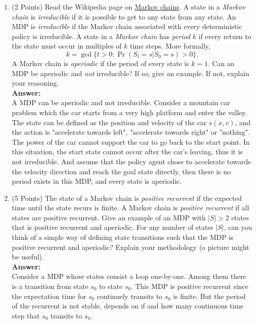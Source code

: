 \documentclass[]{article}
\begin{document}
\begin{enumerate}
    \item (2 Points) Read the Wikipedia page on \href{https://en.wikipedia.org/wiki/Markov_chain}{Markov chains}. A state in a \emph{Markov chain} is \emph{irreducible} if it is possible to get to any state from any state. An MDP is \emph{irreducible} if the Markov chain associated with every deterministic policy is irreducible. A state in a \emph{Markov chain} has \emph{period} $k$ if every return to the state must occur in multiples of $k$ time steps. More formally,
    $$
    k=\operatorname{gcd}\{t>0: \Pr (S_t=s|S_0=s)>0\}.
    $$
    A Markov chain is \emph{aperiodic} if the period of every state is $k=1$. Can an MDP be aperiodic and \emph{not} irreducible? If so, give an example. If not, explain your reasoning. \\
    \textbf{Answer:}\\
    A MDP can be aperiodic and not irreducible. Consider a mountain car problem which the car starts from a very high platform and enter the valley. The state can be defined as the position and velocity of the car $s(x,v)$, and the action is "accelerate towards left", "accelerate towards right" or "nothing". The power of the car cannot support the car to go back to the start point. In this situation, the start state cannot occur after the car's leaving, thus it is not irreducible. And assume that the policy agent chose to accelerate towards the velocity direction and reach the goal state directly, then there is no period exists in this MDP, and every state is aperiodic.
    
   
    \item (5 Points) The state of a Markov chain is \emph{positive recurrent} if the expected time until the state recurs is finite. A Markov chain is \emph{positive recurrent} if all states are positive recurrent. Give an example of an MDP with $|S|>2$ states that is positive recurrent and aperiodic. For any number of states $|S|$, can you think of a simple way of defining state transitions such that the MDP is positive recurrent and aperiodic? Explain your methodology (a picture might be useful). \\
    \textbf{Answer:}\\
    Consider a MDP whose states consist a loop one-by-one. Among them there is a transition from state $s_0$ to state $s_0$. This MDP is positive recurrent since the expectation time for $s_0$ continuely transits to $s_0$ is finite. But the period of the recurrent is not stable, depends on if and how many continuous time step that $s_0$ transits to $s_0$.
    

\end{enumerate}
\end{document}
